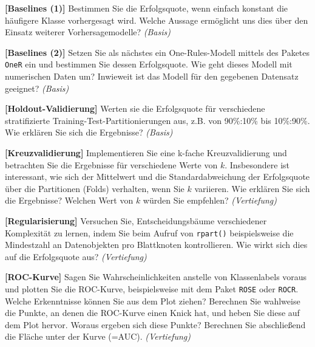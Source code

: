 \documentclass[headinclude,headsepline]{scrartcl}
\newcommand{\taskcategory}[1]{{\color[HTML]{800000}\emph{(#1)}}}
\newcommand{\taskname}[1]{\textbf{[#1]}}
\newcommand{\code}[1]{{\color[HTML]{000080}\texttt{#1}}}
\begin{document}
\vspace{10pt}

\begin{compactenum}[a)]\itemsep10pt
	\item
	\taskname{Baselines (1)}
	Bestimmen Sie die Erfolgsquote, wenn einfach konstant die häufigere Klasse vorhergesagt wird.
	Welche Aussage ermöglicht uns dies über den Einsatz weiterer Vorhersagemodelle?
	\taskcategory{Basis}
	\item
	\taskname{Baselines (2)}
	Setzen Sie als nächstes ein One-Rules-Modell mittels des Paketes \code{OneR} ein und bestimmen Sie dessen Erfolgsquote.
	Wie geht dieses Modell mit numerischen Daten um?
	Inwieweit ist das Modell für den gegebenen Datensatz geeignet?
	\taskcategory{Basis}
	\item
	\taskname{Holdout-Validierung}
	Werten sie die Erfolgsquote für verschiedene stratifizierte Trai\-ning-Test-Partitionierungen aus, z.B. von 90\%:10\% bis 10\%:90\%.
	Wie erklären Sie sich die Ergebnisse?
	\taskcategory{Basis}
	\item
	\taskname{Kreuzvalidierung}
	Implementieren Sie eine k-fache Kreuzvalidierung und betrachten Sie die Ergebnisse für verschiedene Werte von $k$.
	Insbesondere ist interessant, wie sich der Mittelwert und die Standardabweichung der Erfolgsquote über die Partitionen (Folds) verhalten, wenn Sie $k$ variieren.
	Wie erklären Sie sich die Ergebnisse?
	Welchen Wert von $k$ würden Sie empfehlen?
	\taskcategory{Vertiefung}
	\item
	\taskname{Regularisierung}
	Versuchen Sie, Entscheidungsbäume verschiedener Komplexität zu lernen, indem Sie beim Aufruf von \code{rpart()} beispielsweise die Mindestzahl an Datenobjekten pro Blattknoten kontrollieren.
	Wie wirkt sich dies auf die Erfolgsquote aus?
	\taskcategory{Vertiefung}
	\item
	\taskname{ROC-Kurve}
	Sagen Sie Wahrscheinlichkeiten anstelle von Klassenlabels voraus und plotten Sie die ROC-Kurve, beispielsweise mit dem Paket \code{ROSE} oder \code{ROCR}.
	Welche Erkenntnisse können Sie aus dem Plot ziehen?
	Berechnen Sie wahlweise die Punkte, an denen die ROC-Kurve einen Knick hat, und heben Sie diese auf dem Plot hervor.
	Woraus ergeben sich diese Punkte?
	Berechnen Sie abschließend die Fläche unter der Kurve (=AUC).
	\taskcategory{Vertiefung}
\end{compactenum}
\end{document}
